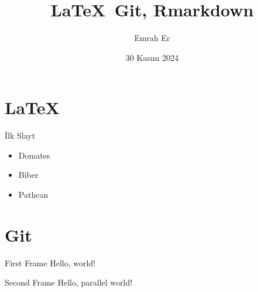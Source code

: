 \documentclass{beamer}
\title{\LaTeX{}\, Git, Rmarkdown}
\date{30 Kasım 2024}
\author{Emrah Er}
\institute{AÜSBF}
\begin{document}
  \maketitle

\section{\LaTeX{}}
  \begin{frame}{İlk Slayt}
    \begin{itemize}
      \item Domates
      \item Biber
      \item Patlıcan
    \end{itemize}
  \end{frame}


\section{Git}
  \begin{frame}{First Frame}
    Hello, world!
  \end{frame}
  \begin{frame}{Second Frame}
    Hello, parallel world!
  \end{frame}
\end{document}
